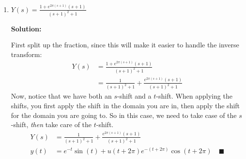 \documentclass[letterpaper, fontsize=11pt]{scrartcl} %
\numberwithin{equation}{section} %
\numberwithin{figure}{section} %
\numberwithin{table}{section} %
\begin{document}
\begin{enumerate}
\begin{enumerate}
\item $Y(s) = \frac{1 + e^{2\pi(s+1)}(s +1)}{(s + 1)^2 + 1}$
\par \textbf{Solution:}
\par First split up the fraction, since this will make it easier to handle the inverse transform:
\begin{align*}
Y(s) &= \frac{1 + e^{2\pi(s+1)}(s +1)}{(s + 1)^2 + 1}\\
&= \frac{1}{(s + 1)^2 + 1} + \frac{e^{2\pi(s+1)}(s +1)}{(s + 1)^2 + 1}
\end{align*}
Now, notice that we have both an $s$-shift and a $t$-shift. When applying the shifts, you first apply the shift in the domain you are in, then apply the shift for the domain you are going to. So in this case, we need to take case of the $s$-shift, \textit{then} take care of the $t$-shift.
\begin{align*}
Y(s) &= \frac{1}{(s + 1)^2 + 1} + \frac{e^{2\pi(s+1)}(s +1)}{(s + 1)^2 + 1}\\
y(t)&=e^{-t}\sin(t) + u(t+2\pi)e^{-(t+2\pi)}\cos(t+2\pi)\quad\blacksquare
\end{align*}

\end{enumerate}


\end{enumerate}
\end{document}
